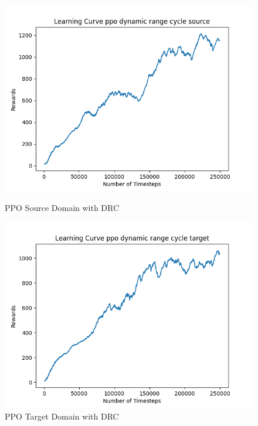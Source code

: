 \documentclass[11pt]{article}
\begin{document}
\begin{figure}[H]
    \begin{minipage}{0.45\textwidth}
        \centering
        \includegraphics[width=\textwidth]{../images/Learning_Curve_PPO_DRC_Source.png}
        \caption{PPO Source Domain with DRC}
        \label{fig:ppo_source_drc}
    \end{minipage}
    \hfill
    \begin{minipage}{0.45\textwidth}
        \centering
        \includegraphics[width=\textwidth]{../images/Learning_Curve_PPO_DRC_Target.png}
        \caption{PPO Target Domain with DRC}
        \label{fig:ppo_target_drc}
    \end{minipage}
\end{figure}
\end{document}
